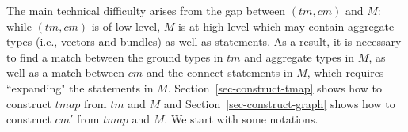The main technical difficulty %
arises from the gap between $(tm, cm)$ and $M$: while $(tm, cm)$ is of low-level, $M$ is at high level which may contain aggregate types (i.e., vectors and bundles) as well as  statements. As a result, %
it is necessary to %
find a match between the ground types in $tm$ and aggregate types in $M$, as well as a match between $cm$ and the connect statements in $M$, which requires ``expanding" the  statements in $M$.
%
%
%
%
%
Section~\ref{sec-construct-tmap} shows how to construct $tmap$ from $tm$ and $M$ and Section~\ref{sec-construct-graph} shows how to construct $cm'$ from $tmap$ and $M$. We start with some notations.

